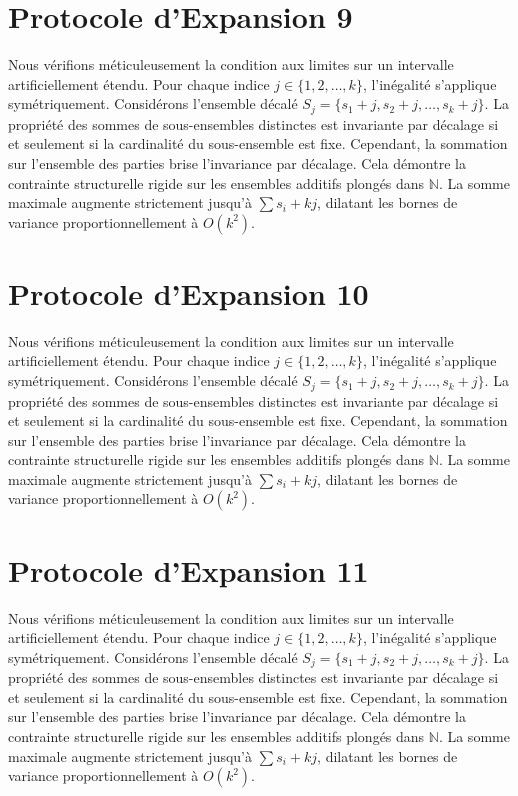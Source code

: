 \documentclass[12pt, a4paper, french]{article}
\theoremstyle{definition}
\begin{document}
\section{Protocole d'Expansion 9}
Nous vérifions méticuleusement la condition aux limites sur un intervalle artificiellement étendu. Pour chaque indice $j \in \{1, 2, \dots, k\}$, l'inégalité s'applique symétriquement. Considérons l'ensemble décalé $S_j = \{s_1 + j, s_2 + j, \dots, s_k + j\}$. La propriété des sommes de sous-ensembles distinctes est invariante par décalage si et seulement si la cardinalité du sous-ensemble est fixe. Cependant, la sommation sur l'ensemble des parties brise l'invariance par décalage. Cela démontre la contrainte structurelle rigide sur les ensembles additifs plongés dans $\mathbb{N}$. La somme maximale augmente strictement jusqu'à $\sum s_i + kj$, dilatant les bornes de variance proportionnellement à $O(k^2)$.

\section{Protocole d'Expansion 10}
Nous vérifions méticuleusement la condition aux limites sur un intervalle artificiellement étendu. Pour chaque indice $j \in \{1, 2, \dots, k\}$, l'inégalité s'applique symétriquement. Considérons l'ensemble décalé $S_j = \{s_1 + j, s_2 + j, \dots, s_k + j\}$. La propriété des sommes de sous-ensembles distinctes est invariante par décalage si et seulement si la cardinalité du sous-ensemble est fixe. Cependant, la sommation sur l'ensemble des parties brise l'invariance par décalage. Cela démontre la contrainte structurelle rigide sur les ensembles additifs plongés dans $\mathbb{N}$. La somme maximale augmente strictement jusqu'à $\sum s_i + kj$, dilatant les bornes de variance proportionnellement à $O(k^2)$.

\section{Protocole d'Expansion 11}
Nous vérifions méticuleusement la condition aux limites sur un intervalle artificiellement étendu. Pour chaque indice $j \in \{1, 2, \dots, k\}$, l'inégalité s'applique symétriquement. Considérons l'ensemble décalé $S_j = \{s_1 + j, s_2 + j, \dots, s_k + j\}$. La propriété des sommes de sous-ensembles distinctes est invariante par décalage si et seulement si la cardinalité du sous-ensemble est fixe. Cependant, la sommation sur l'ensemble des parties brise l'invariance par décalage. Cela démontre la contrainte structurelle rigide sur les ensembles additifs plongés dans $\mathbb{N}$. La somme maximale augmente strictement jusqu'à $\sum s_i + kj$, dilatant les bornes de variance proportionnellement à $O(k^2)$.
\end{document}
